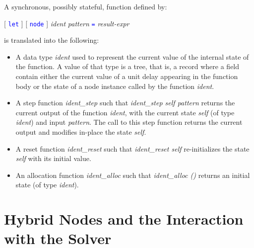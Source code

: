 \documentclass[11pt,titlepage,twoside]{report}
\newcommand{\term}[1]{\textcolor{Blue}{\tt #1}}
\newcommand{\nterm}[1]{\textcolor{BrickRed}{\it #1}}
\newcommand{\term}[1]{{\tt #1}}
\newcommand{\nterm}[1]{{\em #1}}
\begin{document}
A synchronous, possibly stateful, function defined by:
\begin{center}
  [ \term{let} ] [ \term{node} ] \nterm{ident} \nterm{pattern} \term{=}
  \nterm{result-expr}
\end{center}
is translated into the following:
\begin{itemize}
\item
  A data type \nterm{ident} used to represent the current value of the
  internal state of the function. A value of that type is a tree, that
  is, a record where a field contain either the current value of a unit delay
  appearing in the function body or the
  state of a node instance called by the function \nterm{ident}.
\item
  A step function \nterm{ident\_step} such that
    \nterm{ident\_step self pattern} returns the current output of the function
    \nterm{ident}, with the current state \nterm{self} (of type
    \nterm{ident}) and input \nterm{pattern}. The call to this step
    function returns the current output and modifies in-place
    the state \nterm{self}.
  \item
    A reset function \nterm{ident\_reset} such that \nterm{ident\_reset self}
    re-initializes the state \nterm{self} with its initial value.
  \item
    An allocation function \nterm{ident\_alloc} such that \nterm{ident\_alloc ()}
    returns an initial state (of type \nterm{ident}).
\end{itemize}

\section{Hybrid Nodes and the Interaction with the Solver\label{hybridnodes}} %
\end{document}
